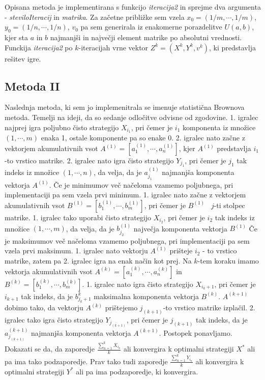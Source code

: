 \documentclass[a4paper,12pt]{article}
\begin{document}
Opisana metoda je implementirana s funkcijo \textit{iteracija2} in sprejme dva argumenta - \textit{steviloIteracij} in \textit{matrika}. 
Za začetne približke sem vzela
$x_0 = (1 / m, \cdots, 1 / m)$, $y_0 = (1 / n, \cdots, 1 / n)$, $v_0$ pa sem generirala iz enakomerne porazdelitve $U(a,b)$, kjer sta $a$ in $b$ najmanjši in največji 
element matrike po absolutni vrednosti. Funckija \textit{iteracija2} po $k$-iteracijah vrne vektor $Z^{k} = (X^{k}, Y^{k}, v^{k})$, ki predstavlja rešitev igre.

\subsection{Metoda II}
Naslednja metoda, ki sem jo implemenitrala se imenuje statistična Brownova metoda. Temelji na ideji, da so sedanje odločitve odvisne od zgodovine.
1. igralec najprej igra poljubno čisto strategijo $X_{i_1}$, pri čemer je $i_1$ komponenta iz množice $(1, \cdots, m)$ enaka 1, ostale komponente pa so enake 0.
2. igralec nato začne z vektorjem akumulativnih vsot $A^{(1)} = [a_1^{(1)}, \cdots, a_n^{(1)}]$, kjer $A^{(1)}$ predstavlja $i_1$-to vrstico matrike. 2. igralec
nato igra čisto strategijo $Y_{j_1}$, pri čemer je $j_1$ tak indeks iz množice $(1, \cdots, n)$, da velja, da je $a_{j_1}^{(1)}$ najmanjša komponenta vektorja $A^{(1)}$. Če je minimumov več načeloma vzamemo
poljubnega, pri implementaciji pa sem vzela prvi minimum.
1. igralec nato začne z vektorjem akumulativnih vsot $B^{(1)} = [b_1^{(1)}, \cdots, b_m^{(1)}]$, pri čemer je $B^{(1)} \; \; \; j$-ti stolpec matrike.
1. igralec tako uporabi čisto strategijo $X_{i_2}$, pri čemer je $i_2$ tak indeks iz množice $(1, \cdots, m)$, da velja, da je $b_{j_2}^{(1)}$ največja komponenta vektorja $B^{(1)}$
Če je maksimumov več načeloma vzamemo poljubnega, pri implementaciji pa sem vzela prvi maksimum. 1. igralec nato vektorju $A^{(1)}$ prišteje $i_2$ - to vrstico matrike, zatem pa 2. igralec igra na enak način kot prej.
Na $k$-tem koraku imamo vektorja akumulativnih vsot $A^{(k)} = [a_1^{(k)}, \cdots, a_n^{(k)}]$ in $B^{(k)} = [b_1^{(k)}, \cdots, b_m^{(k)}]$. 1. igralec nato igra čisto strategijo $X_{i_k+1}$, pri čemer je $i_{k+1}$ tak indeks, da je $b_{j_k+1}^k$ maksimalna komponenta
vektorja $B^{(k)}$. $A^{(k+1)}$ dobimo tako, da vektorju $A^{(k)}$ prištejemo $j_{(k+1)}$-to vrstico matrike izplačil. 2. igralec tako igra čisto strategijo $Y_{j_(k+1)}$, pri čemer je $j_{(k+1)}$ tak indeks, da je $a^{(k+1)}_{j_(k+1)}$ najmanjša komponenta vektorja $A^{(k+1)}$.
Postopek ponavljamo. Dokazati se da, da zaporedje  $\frac{\sum_{n=1}^k X_{i_n}}{k}$ ali konvergira k optimalni strategiji $X^*$ ali pa ima tako podzaporedje. Prav tako tudi zaporedje  $\frac{\sum_{n=1}^k Y_{i_n}}{k}$ ali konvergira k optimalni strategiji $Y^*$ ali pa ima podzaporedje, ki konvergira.
\end{document}
